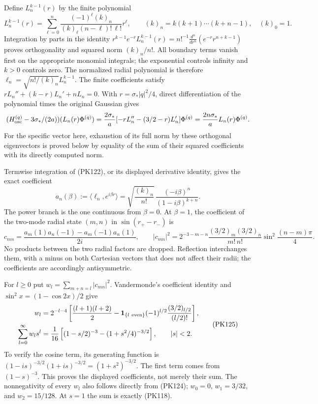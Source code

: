 \documentclass[11pt]{article}
\begin{document}
Define \(L_n^{k-1}(r)\) by the finite polynomial
\[
 L_n^{k-1}(r)=
 \sum_{\ell=0}^n
    \frac{(-1)^\ell(k)_n}{(k)_\ell(n-\ell)!\,\ell!}r^\ell,
 \qquad (k)_n=k(k+1)\cdots(k+n-1),\quad(k)_0=1 .
 \tag{PK122}
\]
Integration by parts in the identity
\(r^{k-1}e^{-r}L_n^{k-1}(r)
 =n!^{-1}\frac{d^n}{dr^n}(e^{-r}r^{n+k-1})\)
proves orthogonality and squared norm \((k)_n/n!\).
All boundary terms vanish first on the appropriate monomial integrals;
the exponential controls infinity and \(k>0\) controls zero.
The normalized radial polynomial is therefore
\(\ell_n=\sqrt{n!/(k)_n}L_n^{k-1}\).
The finite coefficients satisfy
\(rL_n''+(k-r)L_n'+nL_n=0\). With \(r=\sigma_*|q|^2/4\),
direct differentiation of the polynomial times the original Gaussian gives
\[
 (H_{\rm osc}^{(q)}-3\sigma_*/(2a))(L_n(r)\Phi^{(q)})
 =\frac{2\sigma_*}{a}
       [-rL_n''-(3/2-r)L_n']\Phi^{(q)}
 =\frac{2n\sigma_*}{a}L_n(r)\Phi^{(q)} .
\]
For the specific vector here, exhaustion of its full norm by these
orthogonal eigenvectors is proved below by equality of the sum of
their squared coefficients with its directly computed norm.

Termwise integration of (PK122), or its displayed derivative identity,
gives the exact coefficient
\[
 a_n(\beta):=\langle\ell_n,e^{i\beta r}\rangle
 =\sqrt{\frac{(k)_n}{n!}}\,
       \frac{(-i\beta)^n}{(1-i\beta)^{k+n}} .
 \tag{PK123}
\]
The power branch is the one continuous from \(\beta=0\).
At \(\beta=1\), the coefficient of the two-mode radial state
\((m,n)\) in \(\sin(r_+-r_-)\) is
\[
 c_{mn}=
 \frac{a_m(1)a_n(-1)-a_m(-1)a_n(1)}{2i},\qquad
 |c_{mn}|^2
 =2^{-3-m-n}\frac{(3/2)_m(3/2)_n}{m!\,n!}
                    \sin^2\frac{(n-m)\pi}{4}.
 \tag{PK124}
\]
No products between the two radial factors are dropped. Reflection
interchanges them, with a minus on both Cartesian vectors that does
not affect their radii; the coefficients are accordingly antisymmetric.

For \(l\ge0\) put \(w_l=\sum_{m+n=l}|c_{mn}|^2\). Vandermonde's
coefficient identity and \(\sin^2x=(1-\cos2x)/2\) give
\[
 \begin{split}
 w_l&=2^{-l-4}
 \left[
       \frac{(l+1)(l+2)}2
       -\mathbf1_{\{l\ {\rm even}\}}(-1)^{l/2}
                   \frac{(3/2)_{l/2}}{(l/2)!}
 \right],\\
 \sum_{l=0}^\infty w_ls^l
   &=\frac1{16}\left[(1-s/2)^{-3}
                        -(1+s^2/4)^{-3/2}\right],
                   \qquad |s|<2 .
 \end{split}\tag{PK125}
\]
To verify the cosine term, its generating function is
\((1-is)^{-3/2}(1+is)^{-3/2}=(1+s^2)^{-3/2}\).
The first term comes from \((1-s)^{-3}\).
This proves the displayed coefficients, not merely their sum.
The nonnegativity of every \(w_l\) also follows directly from
(PK124); \(w_0=0\), \(w_1=3/32\), and \(w_2=15/128\).
At \(s=1\) the sum is exactly (PK118).
\end{document}
